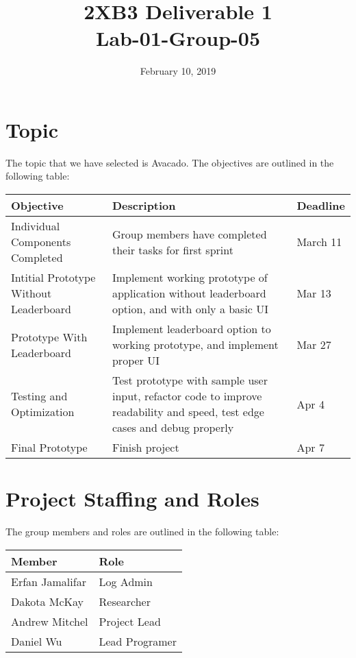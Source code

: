 \documentclass{article}
\title{2XB3 Deliverable 1\\ \large{Lab-01-Group-05}}
\date{February 10, 2019}
\begin{document}
	\maketitle

\section{Topic}

	The topic that we have selected is Avacado. The objectives are outlined in the following table:
	
	\begin{table}[!ht]
		\centering
		\begin{tabular}{|p{3.5cm}|p{6cm}|l|}
			\hline
			\textbf{Objective}&\textbf{Description}&\textbf{Deadline}  \\ \hline
			
			Individual Components Completed
			&Group members have completed their tasks for first sprint
			&March 11 \\ \hline
			
			Intitial Prototype Without Leaderboard
			&Implement working prototype of application without leaderboard option, and with only a basic UI
			&Mar 13 \\ \hline
			
			Prototype With Leaderboard 
			&Implement leaderboard option to working prototype, and implement proper UI
			&Mar 27\\ \hline
			
			Testing and Optimization
			&Test prototype with sample user input, refactor code to improve readability and speed, test edge cases and debug properly
			&Apr 4\\ \hline
			
			Final Prototype
			&Finish project
			&Apr 7\\ \hline
		\end{tabular}
	\end{table}
	
\section{Project Staffing and Roles}

	The group members and roles are outlined in the following table:
	
\begin{table}[!ht]
	\centering
	\begin{tabular}{|l|l|}
		\hline
		\textbf{Member}&\textbf{Role}  \\ \hline
		
		Erfan Jamalifar
		&Log Admin \\ \hline
		
		Dakota McKay
		&Researcher \\ \hline
		
		Andrew Mitchel
		&Project Lead \\ \hline
		
		Daniel Wu
		&Lead Programer \\ \hline
		
	\end{tabular}
\end{table}
	
\end{document}
